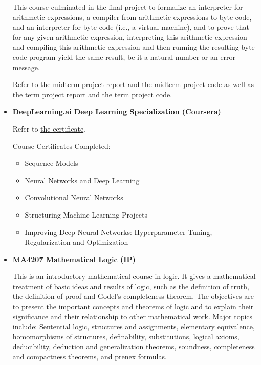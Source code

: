 \documentclass[11pt,reqno,oneside,a4paper]{article}
\begin{document}
\begin{itemize}
		\par This course culminated in the final project to formalize an interpreter for arithmetic expressions, a compiler from arithmetic expressions to byte code, and an interpreter for byte code (i.e., a virtual machine), and to prove that for any given arithmetic expression, interpreting this arithmetic expression and compiling this arithmetic expression and then running the resulting byte-code program yield the same result, be it a natural number or an error message.
		
		Refer to \href{https://github.com/zhangliu6/course-submissions/blob/main/FPP_Midterm%20(4).pdf}{the midterm project report} and \href{https://github.com/zhangliu6/course-submissions/blob/main/midterm-project-liu-new.v}{the midterm project code} as well as \href{https://github.com/zhangliu6/course-submissions/blob/main/FPP_Term_Project_Report.pdf}{the term project report} and \href{https://github.com/zhangliu6/course-submissions/blob/main/term-project-liu-1.v}{the term project code}.
		
		\item \textbf{DeepLearning.ai Deep Learning Specialization (Coursera)} 
		
		Refer to \href{https://www.coursera.org/account/accomplishments/specialization/3PAXFXZG7WAZ}{the certificate}.
		
		Course Certificates Completed:
		\begin{itemize}
			\item Sequence Models
			\item Neural Networks and Deep Learning
			\item Convolutional Neural Networks
			\item Structuring Machine Learning Projects
			\item Improving Deep Neural Networks: Hyperparameter Tuning, Regularization and Optimization
		\end{itemize}
		
		\item \textbf{MA4207 Mathematical Logic (IP)}
		
		\par This is an introductory mathematical course in logic. It gives a mathematical treatment of basic ideas and results of logic, such as the definition of truth, the definition of proof and Godel's completeness theorem. The objectives are to present the important concepts and theorems of logic and to explain their significance and their relationship to other mathematical work. Major topics include: Sentential logic, structures and assignments, elementary equivalence, homomorphisms of structures, definability, substitutions, logical axioms, deducibility, deduction and generalization theorems, soundness, completeness and compactness theorems, and prenex formulas.
		

\end{itemize}
\end{document}
